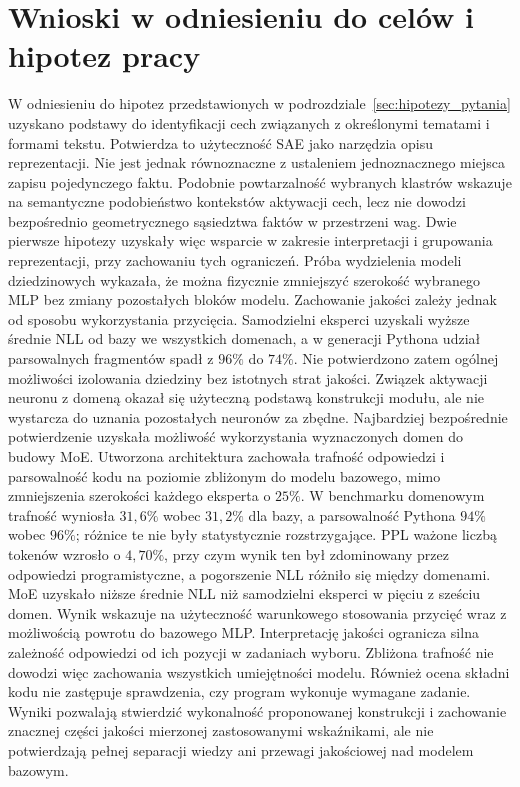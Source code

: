 \section{Wnioski w odniesieniu do celów i hipotez pracy}
\label{sec:wnioski_koncowe}

W odniesieniu do hipotez przedstawionych w podrozdziale~\ref{sec:hipotezy_pytania} uzyskano podstawy do identyfikacji cech związanych z określonymi tematami i formami tekstu. Potwierdza to użyteczność SAE jako narzędzia opisu reprezentacji. Nie jest jednak równoznaczne z ustaleniem jednoznacznego miejsca zapisu pojedynczego faktu. Podobnie powtarzalność wybranych klastrów wskazuje na semantyczne podobieństwo kontekstów aktywacji cech, lecz nie dowodzi bezpośrednio geometrycznego sąsiedztwa faktów w przestrzeni wag. Dwie pierwsze hipotezy uzyskały więc wsparcie w zakresie interpretacji i grupowania reprezentacji, przy zachowaniu tych ograniczeń. \newline
Próba wydzielenia modeli dziedzinowych wykazała, że można fizycznie zmniejszyć szerokość wybranego MLP bez zmiany pozostałych bloków modelu. Zachowanie jakości zależy jednak od sposobu wykorzystania przycięcia. Samodzielni eksperci uzyskali wyższe średnie NLL od bazy we wszystkich domenach, a w generacji Pythona udział parsowalnych fragmentów spadł z $96\%$ do $74\%$. Nie potwierdzono zatem ogólnej możliwości izolowania dziedziny bez istotnych strat jakości. Związek aktywacji neuronu z domeną okazał się użyteczną podstawą konstrukcji modułu, ale nie wystarcza do uznania pozostałych neuronów za zbędne. \newline
Najbardziej bezpośrednie potwierdzenie uzyskała możliwość wykorzystania wyznaczonych domen do budowy MoE. Utworzona architektura zachowała trafność odpowiedzi i parsowalność kodu na poziomie zbliżonym do modelu bazowego, mimo zmniejszenia szerokości każdego eksperta o $25\%$. W benchmarku domenowym trafność wyniosła $31{,}6\%$ wobec $31{,}2\%$ dla bazy, a parsowalność Pythona $94\%$ wobec $96\%$; różnice te nie były statystycznie rozstrzygające. PPL ważone liczbą tokenów wzrosło o $4{,}70\%$, przy czym wynik ten był zdominowany przez odpowiedzi programistyczne, a pogorszenie NLL różniło się między domenami. MoE uzyskało niższe średnie NLL niż samodzielni eksperci w pięciu z sześciu domen. Wynik wskazuje na użyteczność warunkowego stosowania przycięć wraz z możliwością powrotu do bazowego MLP. \newline
Interpretację jakości ogranicza silna zależność odpowiedzi od ich pozycji w zadaniach wyboru. Zbliżona trafność nie dowodzi więc zachowania wszystkich umiejętności modelu. Również ocena składni kodu nie zastępuje sprawdzenia, czy program wykonuje wymagane zadanie. Wyniki pozwalają stwierdzić wykonalność proponowanej konstrukcji i zachowanie znacznej części jakości mierzonej zastosowanymi wskaźnikami, ale nie potwierdzają pełnej separacji wiedzy ani przewagi jakościowej nad modelem bazowym. \newline
